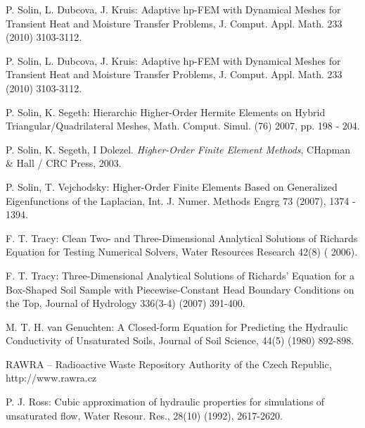 \documentclass[final,3p,times,twocolumn]{elsarticle}
\begin{document}
\begin{thebibliography}{00}

    P. Solin, L. Dubcova, J. Kruis: Adaptive hp-FEM with Dynamical Meshes for Transient Heat and Moisture Transfer Problems, J. Comput. Appl. Math. 233 (2010) 3103-3112.

    P. Solin, L. Dubcova, J. Kruis: Adaptive hp-FEM with Dynamical Meshes for Transient Heat and Moisture Transfer Problems, J. Comput. Appl. Math. 233 (2010) 3103-3112.

    P. Solin, K. Segeth: Hierarchic Higher-Order Hermite Elements on Hybrid
    Triangular/Quadrilateral Meshes, Math. Comput. Simul. (76) 2007, pp. 198 - 204.

    P. Solin, K. Segeth, I Dolezel. {\em Higher-Order Finite Element Methods}, CHapman \& Hall / CRC Press,
    2003.

    P. Solin, T. Vejchodsky: Higher-Order Finite Elements Based on Generalized Eigenfunctions
    of the Laplacian, Int. J. Numer. Methods Engrg 73 (2007), 1374 - 1394.


     F. T. Tracy: Clean Two- and Three-Dimensional Analytical Solutions of Richards Equation for Testing 
    Numerical Solvers, Water Resources Research 42(8) ( 2006).

 F. T. Tracy: Three-Dimensional Analytical Solutions of Richards’ Equation for a Box-Shaped Soil 
    Sample with Piecewise-Constant Head Boundary Conditions on the Top, Journal of Hydrology 336(3-4) (2007) 391-400.


    M. T. H. van Genuchten: A Closed-form Equation for Predicting the Hydraulic Conductivity of Unsaturated Soils, Journal of Soil Science, 44(5) (1980) 892-898.

 RAWRA -- Radioactive Waste Repository Authority of the Czech Republic, http://www.rawra.cz

 P. J. Ross: Cubic approximation of hydraulic properties for simulations of unsaturated flow, Water Resour. Res., 28(10) (1992), 2617-2620.


\end{thebibliography}
\end{document}

